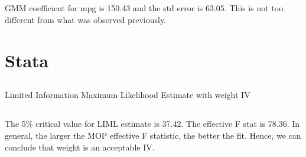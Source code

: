 \documentclass{article}
\begin{document}
\subsection{}
GMM coefficient for mpg is 150.43 and the std error is 63.05. This is not too different from what was observed previously.


\section{Stata}

\subsection{}
\begin{table}[ht!]
    \centering
    
    \caption{Limited Information Maximum Likelihood Estimate with weight IV}
\end{table}

\subsection{}
The 5\% critical value for LIML estimate is 37.42. The effective F stat is 78.36. In general, the larger the MOP effective F statistic, the better the fit. Hence, we can conclude that weight is an acceptable IV. 
\end{document}
